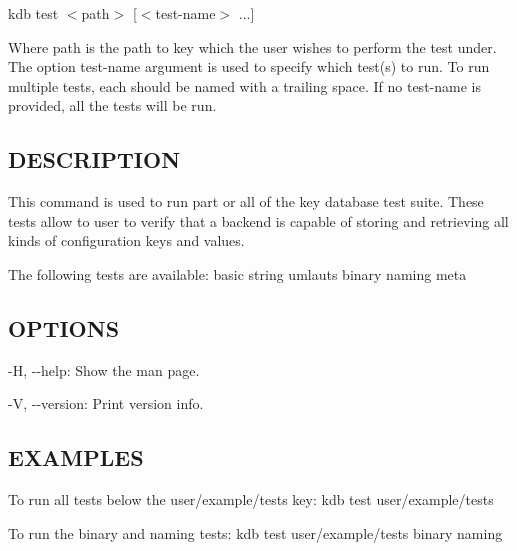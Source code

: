 {\ttfamily kdb test $<$path$>$ \mbox{[}$<$test-\/name$>$ ...\mbox{]}}

Where {\ttfamily path} is the path to key which the user wishes to perform the test under. The option {\ttfamily test-\/name} argument is used to specify which test(s) to run. To run multiple tests, each should be named with a trailing space. If no {\ttfamily test-\/name} is provided, all the tests will be run.

\subsection*{D\+E\+S\+C\+R\+I\+P\+T\+I\+O\+N}

This command is used to run part or all of the key database test suite. These tests allow to user to verify that a backend is capable of storing and retrieving all kinds of configuration keys and values.

The following tests are available\+: basic string umlauts binary naming meta

\subsection*{O\+P\+T\+I\+O\+N\+S}


\begin{DoxyItemize}
\item {\ttfamily -\/\+H}, {\ttfamily -\/-\/help}\+: Show the man page.
\item {\ttfamily -\/\+V}, {\ttfamily -\/-\/version}\+: Print version info.
\end{DoxyItemize}

\subsection*{E\+X\+A\+M\+P\+L\+E\+S}

To run all tests below the {\ttfamily user/example/tests} key\+: {\ttfamily kdb test user/example/tests}

To run the {\ttfamily binary} and {\ttfamily naming} tests\+: {\ttfamily kdb test user/example/tests binary naming} 